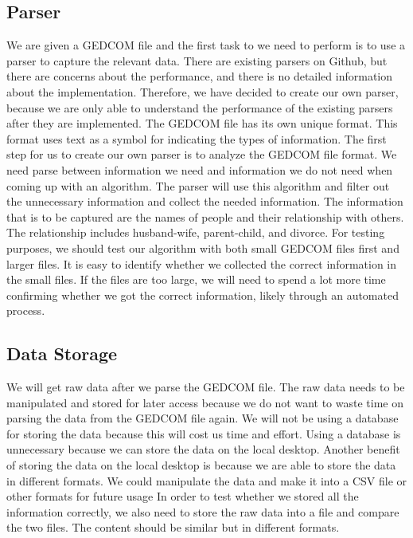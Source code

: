 \documentclass[onecolumn, draftclsnofoot, 10pt, compsoc]{IEEEtran}
\begin{document}
\subsection{Parser}
\begin{singlespace}
We are given a GEDCOM file and the first task to we need to perform is to use a parser to capture the relevant data. There are existing parsers on Github, but there are concerns about the performance, and there is no detailed information about the implementation. Therefore, we have decided to create our own parser, because we are only able to understand the performance of the existing parsers after they are implemented.
\newline
\newline
The GEDCOM file has its own unique format. This format uses text as a symbol for indicating the types of information. The first step for us to create our own parser is to analyze the GEDCOM file format. We need parse between information we need and information we do not need when coming up with an algorithm. The parser will use this algorithm and filter out the unnecessary information and collect the needed information. The information that is to be captured are the names of people and their relationship with others. The relationship includes husband-wife, parent-child, and divorce. 
\newline
\newline
For testing purposes, we should test our algorithm with both small GEDCOM files first and larger files. It is easy to identify whether we collected the correct information in the small files. If the files are too large, we will need to spend a lot more time confirming whether we got the correct information, likely through an automated process.

\end{singlespace}

\subsection{Data Storage}
\begin{singlespace}
We will get raw data after we parse the GEDCOM file. The raw data needs to be manipulated and stored for later access because we do not want to waste time on parsing the data from the GEDCOM file again. We will not be using a database for storing the data because this will cost us time and effort. Using a database is unnecessary because we can store the data on the local desktop. Another benefit of storing the data on the local desktop is because we are able to store the data in different formats. We could manipulate the data and make it into a CSV file or other formats for future usage
\newline
\newline
In order to test whether we stored all the information correctly, we also need to store the raw data into a file and compare the two files. The content should be similar but in different formats.
\end{singlespace}
\end{document}
